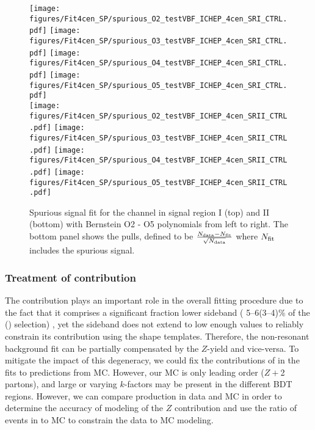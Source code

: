\begin{figure}[htbp]
  \centering
 \texttt{[image: figures/Fit4cen\_SP/spurious\_O2\_testVBF\_ICHEP\_4cen\_SRI\_CTRL.pdf]}
 \texttt{[image: figures/Fit4cen\_SP/spurious\_O3\_testVBF\_ICHEP\_4cen\_SRI\_CTRL.pdf]}
 \texttt{[image: figures/Fit4cen\_SP/spurious\_O4\_testVBF\_ICHEP\_4cen\_SRI\_CTRL.pdf]}
 \texttt{[image: figures/Fit4cen\_SP/spurious\_O5\_testVBF\_ICHEP\_4cen\_SRI\_CTRL.pdf]}\\
 \texttt{[image: figures/Fit4cen\_SP/spurious\_O2\_testVBF\_ICHEP\_4cen\_SRII\_CTRL.pdf]}
 \texttt{[image: figures/Fit4cen\_SP/spurious\_O3\_testVBF\_ICHEP\_4cen\_SRII\_CTRL.pdf]}
 \texttt{[image: figures/Fit4cen\_SP/spurious\_O4\_testVBF\_ICHEP\_4cen\_SRII\_CTRL.pdf]}
 \texttt{[image: figures/Fit4cen\_SP/spurious\_O5\_testVBF\_ICHEP\_4cen\_SRII\_CTRL.pdf]}\\
\caption{Spurious signal fit for the \fourcentral channel in signal region I (top) and II (bottom) with Bernstein O2 - O5 polynomials from left to right. The bottom panel shows the pulls, defined to be $\frac{N_{\rm data} - N_{\rm fit}}{\sqrt{N_{\rm data}}}$ where $N_{\rm fit}$ includes the spurious signal.}
  \label{fig:Fit_SP_4cen-old}
\end{figure}

\clearpage

\subsubsection{Treatment of \zjets{} contribution}
\label{sec:app-ztreat}

The \zjets{} contribution plays an important role in the overall fitting procedure due to the fact that it comprises a significant fraction lower \Mbb{} sideband ( 5--6(3--4)\% of the \fourcentral(\twocentral) selection) , yet the sideband does not extend to low enough \Mbb{} values to reliably constrain its contribution using the shape templates.  Therefore, the non-resonant background fit can be partially compensated by the $Z$-yield and vice-versa.  To mitigate the impact of this degeneracy, we could fix the contributions of \zjets{} in the fits to predictions from MC.  However, our \zjets{} MC is only leading order ($Z+$2 partons), and large or varying $k$-factors may be present in the different BDT regions.  However, we can compare \zmujets{} production in data and MC in order to determine the accuracy of modeling of the $Z$ contribution and  use the ratio of events in \zmujets{}  to \zjets{} MC to constrain the data to MC modeling.  

